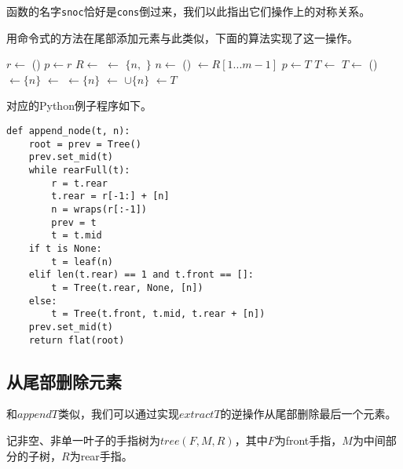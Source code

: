 \documentclass[UTF8]{article}
\begin{document}
函数的名字\texttt{snoc}恰好是\texttt{cons}倒过来，我们以此指出它们操作上的对称关系。

用命令式的方法在尾部添加元素与此类似，下面的算法实现了这一操作。

\begin{algorithmic}
  \State $r \gets $ ()
  \State $p \gets r$
  \State {}
    \State $R \gets $  
    \State {} $\gets$ $\{n, $  $\}$ 
    \State $n \gets$ ()
    \State {} $\gets R[1...m-1]$ 
    \State $p \gets T$
    \State $T \gets$ 
  \EndWhile
    \State $T \gets$ ()
    \State {} $\gets \{ n \}$
    \State {} $\gets$ 
    \State {} $\gets \{ n \}$
  \Else
    \State {} $\gets$  $\cup \{ n \} $
  \EndIf
  \State {} $\gets T$
  \State \Return {}
\EndFunction
\end{algorithmic}

对应的Python例子程序如下。

\lstset{language=Python}
\begin{lstlisting}
def append_node(t, n):
    root = prev = Tree()
    prev.set_mid(t)
    while rearFull(t):
        r = t.rear
        t.rear = r[-1:] + [n]
        n = wraps(r[:-1])
        prev = t
        t = t.mid
    if t is None:
        t = leaf(n)
    elif len(t.rear) == 1 and t.front == []:
        t = Tree(t.rear, None, [n])
    else:
        t = Tree(t.front, t.mid, t.rear + [n])
    prev.set_mid(t)
    return flat(root)
\end{lstlisting}

\subsection{从尾部删除元素}

和$appendT$类似，我们可以通过实现$extractT$的逆操作从尾部删除最后一个元素。

记非空、非单一叶子的手指树为$tree(F, M, R)$，其中$F$为front手指，$M$为中间部分的子树，$R$为rear手指。
\end{document}
